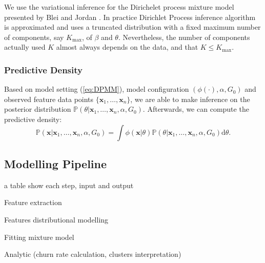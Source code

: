 We use the variational inference for the Dirichelet process mixture model presented by Blei and Jordan \cite{blei2006}. In practice Dirichlet Process inference algorithm is approximated and uses a truncated distribution with a fixed maximum number of components, say $K_{\max}$, of $\beta$ and $\theta$. Nevertheless, the number of components actually used $K$ almost always depends on the data, and that $K \leq K_{\max}$.

\subsubsection{Predictive Density}

Based on model setting (\ref{eq:DPMM}), model configuration $(\phi(\cdot), \alpha, G_0)$ and observed feature data points $\{ \mathbf{x}_1, \dots, \mathbf{x}_n \}$, we are able to make inference on the posterior distribution $\mathbb{P}(\theta | \mathbf{x}_1, \dots, \mathbf{x}_n, \alpha, G_0)$. Afterwards, we can compute the predictive density:
\begin{equation}
\mathbb{P} (\mathbf{x} | \mathbf{x}_1, \dots, \mathbf{x}_n, \alpha, G_0) = \int \phi(\mathbf{x} | \theta ) \mathbb{P}(\theta | \mathbf{x}_1, \dots, \mathbf{x}_n, \alpha, G_0) \text{d} \theta.
\end{equation}

\subsection{Modelling Pipeline}

a table show each step, input and output

Feature extraction

Features distributional modelling

Fitting mixture model

Analytic (churn rate calculation, clusters interpretation)